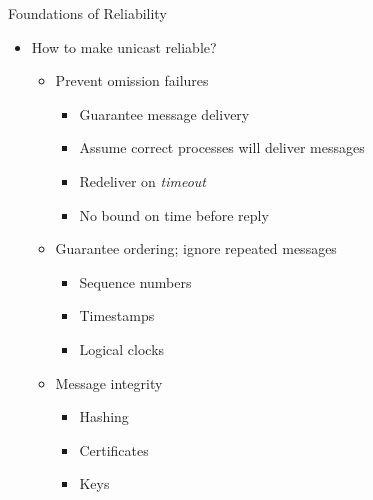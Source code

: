 \documentclass[pdftex]{beamer}
\begin{document}
\begin{frame}{Foundations of Reliability}

\begin{itemize}
	\item How to make unicast reliable?
	\begin{itemize}
	
		\item Prevent \alert{omission failures}
		\begin{itemize}
			 \item Guarantee message delivery
			 \item Assume correct processes will deliver messages
			 \item Redeliver on \emph{timeout}
			 \item No bound on time before reply
		\end{itemize}
		
		\item Guarantee ordering; ignore repeated messages
		\begin{itemize}
			 \item Sequence numbers
			 \item Timestamps
			 \item Logical clocks
		\end{itemize}

		\item Message integrity
		\begin{itemize}
			 \item Hashing
			 \item Certificates
			 \item Keys
		\end{itemize}
	\end{itemize}
\end{itemize}
\end{frame}
\end{document}
